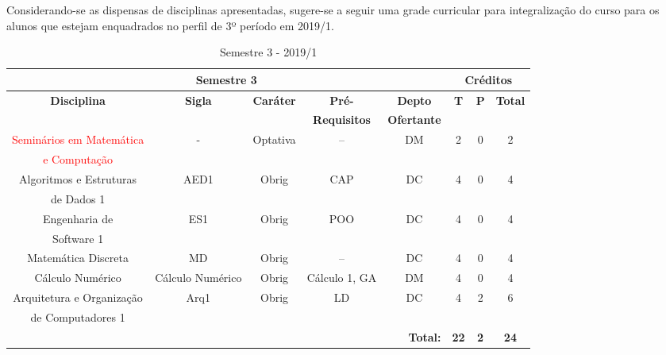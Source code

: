 \doublespacing

Considerando-se as dispensas de disciplinas apresentadas, sugere-se a seguir  uma grade curricular para integralização do curso para os alunos que estejam enquadrados no perfil de 3º período em 2019/1. 


\singlespacing

\begin{table}[H]
\caption{Semestre 3 - 2019/1}
\centering
\footnotesize
\begin{tabular}{|c|c|c|c|c|c|c|c|} %
\hline
\hline
\multicolumn{5}{|c|}{\textbf{Semestre 3}}  &  \multicolumn{3}{|c|}{\textbf{Créditos}} \\
\hline
\hline
\textbf{Disciplina} & \textbf{Sigla} & \textbf{Caráter} & \textbf{Pré-} & \textbf{Depto} &  \textbf{T}  &  \textbf{P}  & \textbf{Total} \\ 
& & & \textbf{Requisitos}  & \textbf{Ofertante} & & & \\
\hline 

\textcolor{red}{Seminários em Matemática} & - & Optativa & -- & DM  & 2 & 0 & 2 \\
\textcolor{red}{e Computação} & & & & & & & \\
\hline


Algoritmos e Estruturas & AED1 & Obrig & CAP & DC  & 4 & 0 & 4 \\
de Dados 1 & & & & & & & \\
\hline


Engenharia de  & ES1 & Obrig & POO & DC  & 4 & 0 & 4 \\
Software 1 & & & & & & & \\
\hline

Matemática Discreta & MD & Obrig & -- & DC  & 4 & 0 & 4 \\
\hline

Cálculo Numérico & Cálculo Numérico & Obrig & Cálculo 1, GA & DM  & 4 & 0 & 4 \\  
\hline

Arquitetura e Organização & Arq1 & Obrig & LD & DC & 4 & 2 & 6 \\
de Computadores 1 & & & & & & & \\
\hline

\hline
\multicolumn{5}{|r|}{\textbf{Total:}}  &  \textbf{22}  &  \textbf{2}   & \textbf{24} \\ %
\hline
\hline
\end{tabular}
\label{tab:matriz1m}
\end{table}


